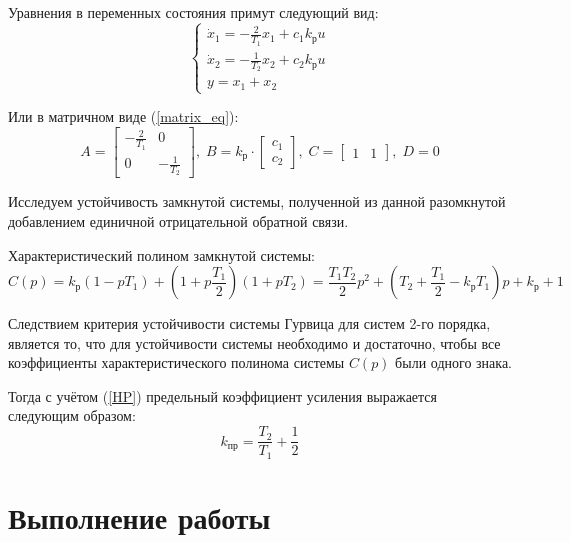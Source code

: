 	Уравнения в переменных состояния примут следующий вид:
	\begin{equation}
		\begin{cases}
			\dot{x}_1 = -\frac{2}{T_1} x_1 + c_1 k_\text{р} u \\
			\dot{x}_2 = -\frac{1}{T_2} x_2 + c_2 k_\text{р} u \\ 
			y = x_1 + x_2
		\end{cases}
	\end{equation}

	Или в матричном виде (\ref{matrix_eq}):
	\begin{equation}
		A = \begin{bmatrix}
			-\frac{2}{T_1} & 0 \\
			0 & -\frac{1}{T_2}
		\end{bmatrix},\; 
		B = k_\text{р} \cdot \begin{bmatrix}
			c_1 \\ c_2
		\end{bmatrix},\;
		C = \begin{bmatrix}
			1 & 1
		\end{bmatrix},\;D=0
		\label{matrices2}
	\end{equation}

	Исследуем устойчивость замкнутой системы, полученной из данной разомкнутой добавлением единичной отрицательной обратной связи.
	
	Характеристический полином замкнутой системы:
	\begin{equation}
		C(p) = k_\text{р} (1 - pT_1) + \left(1 + p\frac{T_1}{2}\right)(1 + pT_2) = \frac{T_1 T_2}{2} p^2 + \left( T_2 + \frac{T_1}{2} - k_\text{р} T_1 \right) p + k_\text{р} + 1
		\label{HP}
	\end{equation}
	
	Следствием критерия устойчивости системы Гурвица для систем 2-го порядка, является то, что для устойчивости системы необходимо и достаточно, чтобы все коэффициенты характеристического полинома системы $C(p)$ были одного знака.
	
	Тогда с учётом (\ref{HP}) предельный коэффициент усиления выражается следующим образом:
	\begin{equation}
		k_\text{пр} = \frac{T_2}{T_1} + \frac{1}{2}
		\label{kpr}
	\end{equation}

	\section{Выполнение работы}
	
